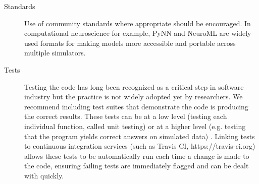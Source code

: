 \documentclass[11pt]{article}
\begin{document}
\begin{description}
  
\item [Standards] Use of community standards where appropriate should
  be encouraged. In computational neuroscience for example, PyNN
  \cite{Davison2009} and NeuroML \cite{CannonEtAl2014} are widely used
  formats for making models more accessible and portable across
  multiple simulators.

\item [Tests] Testing the code has long been recognized
  as a critical step in software industry but the practice is not
  widely adopted yet by researchers. We recommend including test
  suites that demonstrate the code is producing the correct
  results\cite{Axelrod2014-xi}. These tests can be at a low level
  (testing each individual function, called unit testing) or at a
  higher level (e.g. testing that the program yields correct answers
  on simulated data) \cite{wilson_best_2014}. Linking tests to continuous 
  integration services (such as Travis CI, https://travis-ci.org) allows 
  these tests to be automatically run each time a change is made to the code,
  ensuring failing tests are immediately flagged and can be dealt with quickly.

\end{description}
\end{document}

